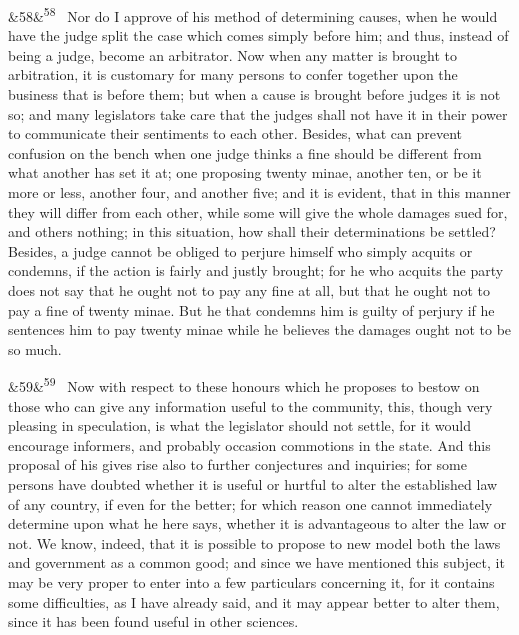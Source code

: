 \documentclass[12pt]{article}
\newcommand{\para}[1][]{\par\noindent\ifx&#1&\else\textsuperscript{\footnotesize #1}~\fi}
\begin{document}
\para[58] Nor do I approve of his method of determining causes, when he would have the judge split the case which comes simply before him; and thus, instead of being a judge, become an arbitrator. Now when any matter is brought to arbitration, it is customary for many persons to confer together upon the business that is before them; but when a cause is brought before judges it is not so; and many legislators take care that the judges shall not have it in their power to communicate their sentiments to each other. Besides, what can prevent confusion on the bench when one judge thinks a fine should be different from what another has set it at; one proposing twenty minae, another ten, or be it more or less, another four, and another five; and it is evident, that in this manner they will differ from each other, while some will give the whole damages sued for, and others nothing; in this situation, how shall their determinations be settled? Besides, a judge cannot be obliged to perjure himself who simply acquits or condemns, if the action is fairly and justly brought; for he who acquits the party does not say that he ought not to pay any fine at all, but that he ought not to pay a fine of twenty minae. But he that condemns him is guilty of perjury if he sentences him to pay twenty minae while he believes the damages ought not to be so much.

\para[59] Now with respect to these honours which he proposes to bestow on those who can give any information useful to the community, this, though very pleasing in speculation, is what the legislator should not settle, for it would encourage informers, and probably occasion commotions in the state. And this proposal of his gives rise also to further conjectures and inquiries; for some persons have doubted whether it is useful or hurtful to alter the established law of any country, if even for the better; for which reason one cannot immediately determine upon what he here says, whether it is advantageous to alter the law or not. We know, indeed, that it is possible to propose to new model both the laws and government as a common good; and since we have mentioned this subject, it may be very proper to enter into a few particulars concerning it, for it contains some difficulties, as I have already said, and it may appear better to alter them, since it has been found useful in other sciences.
\end{document}
